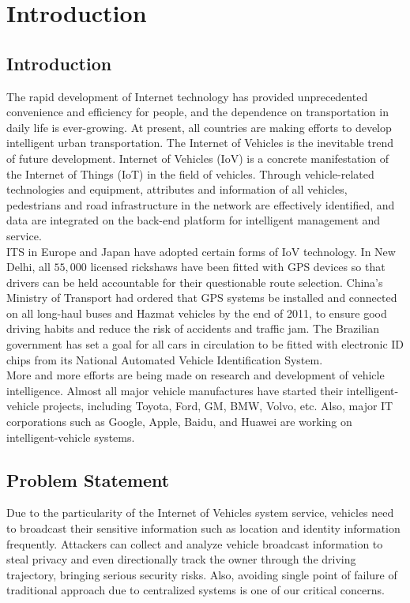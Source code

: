 \chapter{Introduction}
	\label{sec:Introduction} 
	
	\section{Introduction}
		\label{}
		The rapid development of Internet technology has provided unprecedented convenience and efficiency for people, and the dependence on transportation in daily life is ever-growing. At present, all countries are making efforts to develop intelligent urban transportation. The Internet of Vehicles is the inevitable trend of future development. Internet of Vehicles (IoV) is a concrete manifestation of the Internet of Things (IoT) in the field of vehicles. Through vehicle-related technologies and equipment, attributes and information of all vehicles, pedestrians and road infrastructure in the network are effectively identified, and data are integrated on the back-end platform for intelligent management and service. \\
		ITS in Europe and Japan have adopted certain forms of IoV technology. In New Delhi, all $55,000$ licensed rickshaws have been fitted with GPS devices so that drivers can be held accountable for their questionable route selection. China’s Ministry of Transport had ordered that GPS systems be installed and connected on all long-haul buses and Hazmat vehicles by the end of 2011, to ensure good driving habits and reduce the risk of accidents and traffic jam. The Brazilian government has set a goal for all cars in circulation to be fitted with electronic ID chips from its National Automated Vehicle Identification System. \\
		More and more efforts are being made on research and development of vehicle intelligence. Almost all major vehicle manufactures have started their intelligent-vehicle projects, including Toyota, Ford, GM, BMW, Volvo, etc. Also, major IT corporations such as Google, Apple, Baidu, and Huawei are working on intelligent-vehicle systems. 
	
	\section{Problem Statement}
		\label{}
		Due to the particularity of the Internet of Vehicles system service, vehicles need to broadcast their sensitive information such as location and identity information frequently. Attackers can collect and analyze vehicle broadcast information to steal privacy and even directionally track the owner through the driving trajectory, bringing serious security risks. Also, avoiding single point of failure of traditional approach due to centralized systems is one of our critical concerns. 
		
